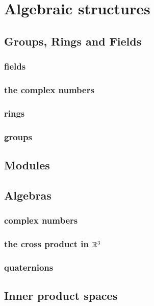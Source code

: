 
\chapter{Algebraic structures}
\label{ch:structs}

\section{Groups, Rings and Fields}
\label{sec:GRF}

\subsection{fields}
\subsection{the complex numbers}
\subsection{rings}
\subsection{groups}

\section{Modules}
\label{sec:mod} 

\section{Algebras}
\label{sec:alg}

\subsection{complex numbers}
\subsection{the cross product in ${\mathbb R}^3$}
\subsection{quaternions}

\section{Inner product spaces}
